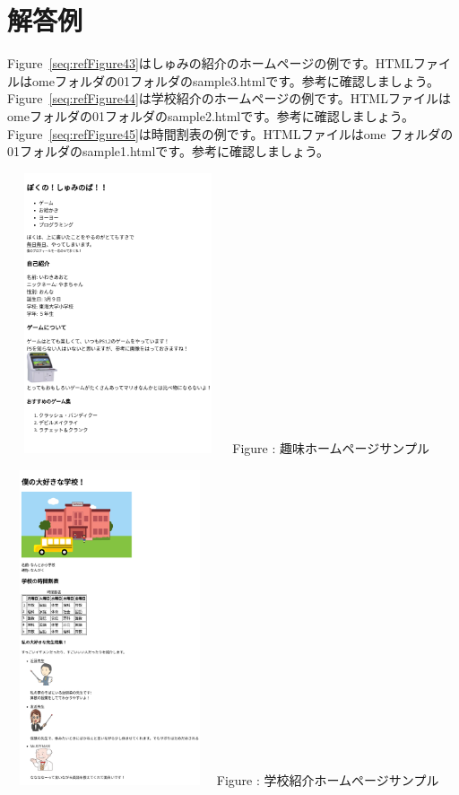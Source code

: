 \documentclass[a4paper,12pt]{jarticle}
\begin{document}
\section{解答例}
 {Figure~\ref{seq:refFigure43}はしゅみの紹介のホームページの例です。HTMLファイルはomeフォルダの01フォルダのsample3.htmlです。参考に確認しましょう。}\\
{Figure~\ref{seq:refFigure44}は学校紹介のホームページの例です。HTMLファイルはomeフォルダの01フォルダのsample2.htmlです。参考に確認しましょう。}\\
{Figure~\ref{seq:refFigure45}は時間割表の例です。HTMLファイルはome
フォルダの01フォルダのsample1.htmlです。参考に確認しましょう。}\\

\centering
\begin{minipage}{7.518cm}
  {\upshape
    \includegraphics[width=6.525cm,height=8.262cm]{textbook-img209.png}
    \newline
    Figure {\theFigure\label{seq:refFigure43}}:
    趣味ホームページサンプル}
\end{minipage}
\begin{minipage}{7.703cm}
  {\upshape
    \includegraphics[width=6.062cm,height=9.306cm]{textbook-img210.png}
    \newline
    Figure {\theFigure\label{seq:refFigure44}}:
    学校紹介ホームページサンプル}
\end{minipage}
\end{document}
